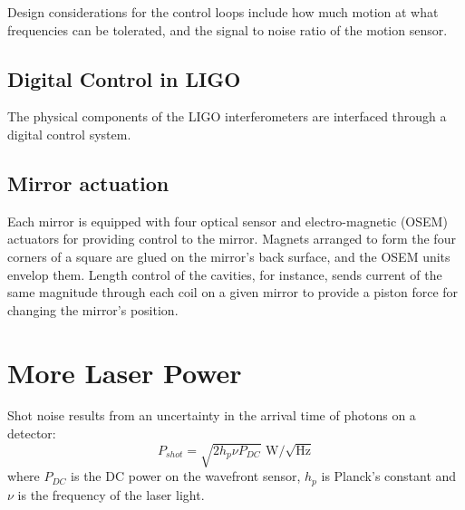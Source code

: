 Design considerations for the control loops include how much motion at
what frequencies can be tolerated, and the signal to noise ratio of
the motion sensor.



\subsection{Digital Control in LIGO}
The physical components of the LIGO interferometers are interfaced
through a digital control system. 



\subsection{Mirror actuation}
Each mirror is equipped with four optical sensor and electro-magnetic
(OSEM) actuators for providing control to the mirror. Magnets arranged
to form the four corners of a square are glued on the mirror's back
surface, and the OSEM units envelop them. Length control of the
cavities, for instance, sends current of the same magnitude through
each coil on a given mirror to provide a piston force for changing the
mirror's position.



\section{More Laser Power}
Shot noise results from an uncertainty in the arrival time of photons
on a detector:
\begin{equation}
P_{shot} = \sqrt{2 h_p \nu P_{DC}} \mbox{ W/$\sqrt{\mbox{Hz}}$}
\label{eq:shotnoise}
\end{equation}
where $P_{DC}$ is the DC power on the wavefront sensor, $h_p$ is Planck's constant and $\nu$ is the frequency of the laser light. 



